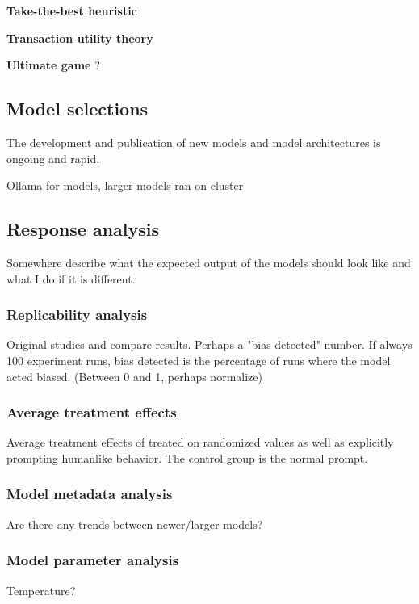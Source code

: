 \par \textbf{Take-the-best heuristic} 

\par \textbf{Transaction utility theory} 

\par \textbf{Ultimate game} ?


\subsection{Model selections}
\par The development and publication of new models and model architectures is ongoing and rapid. 

Ollama for models, larger models ran on cluster


\subsection{Response analysis}
Somewhere describe what the expected output of the models should look like and what I do if it is different.

\subsubsection{Replicability analysis}
Original studies and compare results. Perhaps a "bias detected" number. If always 100 experiment runs, bias detected is the percentage of runs where the model acted biased. (Between 0 and 1, perhaps normalize)

\subsubsection{Average treatment effects}
Average treatment effects of treated on randomized values as well as explicitly prompting humanlike behavior. The control group is the normal prompt.

\subsubsection{Model metadata analysis}
Are there any trends between newer/larger models?

\subsubsection{Model parameter analysis}
Temperature?